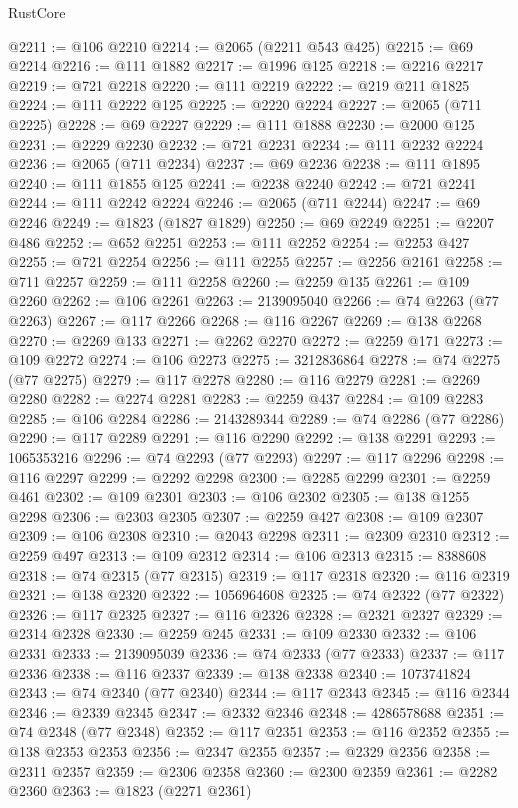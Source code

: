 \begin{lexlean}{RustCore}
\begin{coremodule}
@2211 := @106 @2210
@2214 := @2065 (@2211 @543 @425)
@2215 := @69 @2214
@2216 := @111 @1882
@2217 := @1996 @125
@2218 := @2216 @2217
@2219 := @721 @2218
@2220 := @111 @2219
@2222 := @219 @211 @1825
@2224 := @111 @2222 @125
@2225 := @2220 @2224
@2227 := @2065 (@711 @2225)
@2228 := @69 @2227
@2229 := @111 @1888
@2230 := @2000 @125
@2231 := @2229 @2230
@2232 := @721 @2231
@2234 := @111 @2232 @2224
@2236 := @2065 (@711 @2234)
@2237 := @69 @2236
@2238 := @111 @1895
@2240 := @111 @1855 @125
@2241 := @2238 @2240
@2242 := @721 @2241
@2244 := @111 @2242 @2224
@2246 := @2065 (@711 @2244)
@2247 := @69 @2246
@2249 := @1823 (@1827 @1829)
@2250 := @69 @2249
@2251 := @2207 @486
@2252 := @652 @2251
@2253 := @111 @2252
@2254 := @2253 @427
@2255 := @721 @2254
@2256 := @111 @2255
@2257 := @2256 @2161
@2258 := @711 @2257
@2259 := @111 @2258
@2260 := @2259 @135
@2261 := @109 @2260
@2262 := @106 @2261
@2263 := 2139095040
@2266 := @74 @2263 (@77 @2263)
@2267 := @117 @2266
@2268 := @116 @2267
@2269 := @138 @2268
@2270 := @2269 @133
@2271 := @2262 @2270
@2272 := @2259 @171
@2273 := @109 @2272
@2274 := @106 @2273
@2275 := 3212836864
@2278 := @74 @2275 (@77 @2275)
@2279 := @117 @2278
@2280 := @116 @2279
@2281 := @2269 @2280
@2282 := @2274 @2281
@2283 := @2259 @437
@2284 := @109 @2283
@2285 := @106 @2284
@2286 := 2143289344
@2289 := @74 @2286 (@77 @2286)
@2290 := @117 @2289
@2291 := @116 @2290
@2292 := @138 @2291
@2293 := 1065353216
@2296 := @74 @2293 (@77 @2293)
@2297 := @117 @2296
@2298 := @116 @2297
@2299 := @2292 @2298
@2300 := @2285 @2299
@2301 := @2259 @461
@2302 := @109 @2301
@2303 := @106 @2302
@2305 := @138 @1255 @2298
@2306 := @2303 @2305
@2307 := @2259 @427
@2308 := @109 @2307
@2309 := @106 @2308
@2310 := @2043 @2298
@2311 := @2309 @2310
@2312 := @2259 @497
@2313 := @109 @2312
@2314 := @106 @2313
@2315 := 8388608
@2318 := @74 @2315 (@77 @2315)
@2319 := @117 @2318
@2320 := @116 @2319
@2321 := @138 @2320
@2322 := 1056964608
@2325 := @74 @2322 (@77 @2322)
@2326 := @117 @2325
@2327 := @116 @2326
@2328 := @2321 @2327
@2329 := @2314 @2328
@2330 := @2259 @245
@2331 := @109 @2330
@2332 := @106 @2331
@2333 := 2139095039
@2336 := @74 @2333 (@77 @2333)
@2337 := @117 @2336
@2338 := @116 @2337
@2339 := @138 @2338
@2340 := 1073741824
@2343 := @74 @2340 (@77 @2340)
@2344 := @117 @2343
@2345 := @116 @2344
@2346 := @2339 @2345
@2347 := @2332 @2346
@2348 := 4286578688
@2351 := @74 @2348 (@77 @2348)
@2352 := @117 @2351
@2353 := @116 @2352
@2355 := @138 @2353 @2353
@2356 := @2347 @2355
@2357 := @2329 @2356
@2358 := @2311 @2357
@2359 := @2306 @2358
@2360 := @2300 @2359
@2361 := @2282 @2360
@2363 := @1823 (@2271 @2361)

\end{coremodule}
\end{lexlean}
